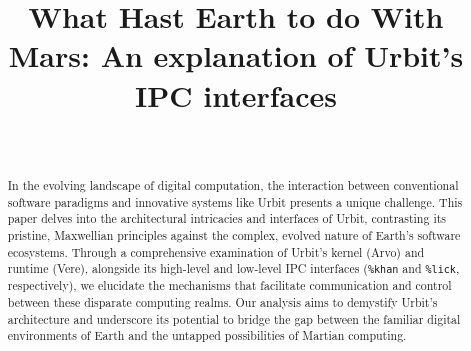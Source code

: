 \documentclass[twoside]{article}
\title{What Hast Earth to do With Mars: An explanation of Urbit's IPC interfaces}
\author{~\authorpatp \\ \affiliation}
\date{}
\begin{document}
\maketitle
\thispagestyle{firststyle}

\begin{abstract}
In the evolving landscape of digital computation, the interaction between conventional software paradigms and innovative systems like Urbit presents a unique challenge.
This paper delves into the architectural intricacies and interfaces of Urbit, contrasting its pristine, Maxwellian principles against the complex, evolved nature of Earth's software ecosystems.
Through a comprehensive examination of Urbit’s kernel (Arvo) and runtime (Vere), alongside its high-level and low-level IPC interfaces (\texttt{\%khan} and \texttt{\%lick}, respectively), we elucidate the mechanisms that facilitate communication and control between these disparate computing realms. 
Our analysis aims to demystify Urbit's architecture and underscore its potential to bridge the gap between the familiar digital environments of Earth and the untapped possibilities of Martian computing.




\end{abstract}
\end{document}
